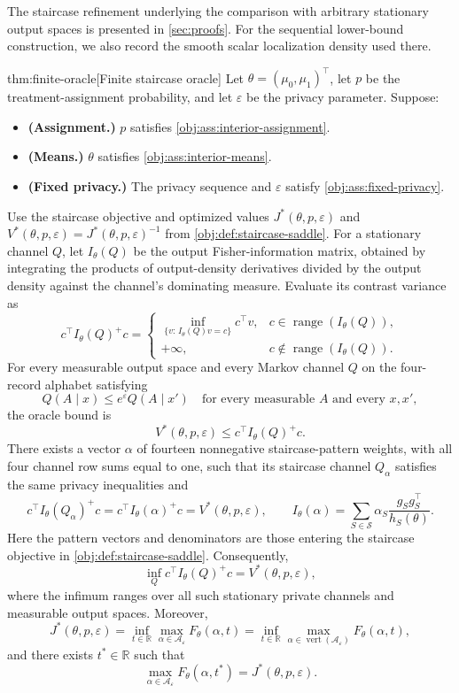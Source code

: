 The staircase refinement underlying the comparison with arbitrary stationary output spaces is presented in \cref{sec:proofs}. For the sequential lower-bound construction, we also record the smooth scalar localization density used there.

\begin{theoremv}{thm:finite-oracle}[Finite staircase oracle]
Let \(\theta=(\mu_0,\mu_1)^\top\), let \(p\) be the treatment-assignment probability, and let \(\varepsilon\) be the privacy parameter. Suppose:
\begin{itemize}
\item \textbf{(Assignment.)} \(p\) satisfies \cref{obj:ass:interior-assignment}.
\item \textbf{(Means.)} \(\theta\) satisfies \cref{obj:ass:interior-means}.
\item \textbf{(Fixed privacy.)} The privacy sequence and \(\varepsilon\) satisfy \cref{obj:ass:fixed-privacy}.
\end{itemize}
Use the staircase objective and optimized values \(J^*(\theta,p,\varepsilon)\) and \(V^*(\theta,p,\varepsilon)=J^*(\theta,p,\varepsilon)^{-1}\) from \cref{obj:def:staircase-saddle}. For a stationary channel \(Q\), let \(I_\theta(Q)\) be the output Fisher-information matrix, obtained by integrating the products of output-density derivatives divided by the output density against the channel's dominating measure. Evaluate its contrast variance as
\[
c^\top I_\theta(Q)^+c
=
\begin{cases}
\displaystyle
\inf_{\{v:\,I_\theta(Q)v=c\}}c^\top v,
& c\in\operatorname{range}(I_\theta(Q)),\\
+\infty,
& c\notin\operatorname{range}(I_\theta(Q)).
\end{cases}
\]
For every measurable output space and every Markov channel \(Q\) on the four-record alphabet satisfying
\[
Q(A\mid x)\le e^\varepsilon Q(A\mid x')
\quad
\text{for every measurable }A\text{ and every }x,x',
\]
the oracle bound is
\[
V^*(\theta,p,\varepsilon)\le c^\top I_\theta(Q)^+c.
\]
There exists a vector \(\alpha\) of fourteen nonnegative staircase-pattern weights, with all four channel row sums equal to one, such that its staircase channel \(Q_\alpha\) satisfies the same privacy inequalities and
\[
c^\top I_\theta(Q_\alpha)^+c
=
c^\top I_\theta(\alpha)^+c
=
V^*(\theta,p,\varepsilon),
\qquad
I_\theta(\alpha)
=
\sum_{S\in\mathcal S}
\alpha_S\frac{g_Sg_S^\top}{h_S(\theta)}.
\]
Here the pattern vectors and denominators are those entering the staircase objective in \cref{obj:def:staircase-saddle}. Consequently,
\[
\inf_Q c^\top I_\theta(Q)^+c=V^*(\theta,p,\varepsilon),
\]
where the infimum ranges over all such stationary private channels and measurable output spaces. Moreover,
\[
J^*(\theta,p,\varepsilon)
=
\inf_{t\in\mathbb R}
\max_{\alpha\in\mathcal A_\varepsilon}F_\theta(\alpha,t)
=
\inf_{t\in\mathbb R}
\max_{\alpha\in\operatorname{vert}(\mathcal A_\varepsilon)}
F_\theta(\alpha,t),
\]
and there exists \(t^*\in\mathbb R\) such that
\[
\max_{\alpha\in\mathcal A_\varepsilon}
F_\theta(\alpha,t^*)
=
J^*(\theta,p,\varepsilon).
\]
\end{theoremv}

